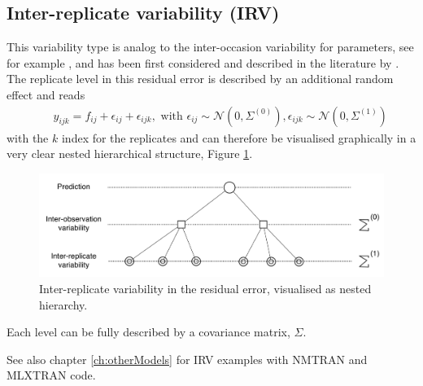 \subsection{Inter-replicate variability (IRV)}
This variability type is analog to the inter-occasion variability for parameters,
see for example \cite{LavielleBook:2014}, and has been first considered and described in the 
literature by \cite{Karlsson:1995rm}. The replicate level in this residual error 
is described by an additional random effect and reads  
\begin{eqnarray}
	&& y_{ijk} = f_{ij} + \epsilon_{ij} + \epsilon_{ijk}, \text{ with } \epsilon_{ij} \sim \mathcal{N}(0,\Sigma^{(0)}), \epsilon_{ijk} \sim \mathcal{N}(0,\Sigma^{(1)}) 	\nonumber
\end{eqnarray}
with the $k$ index for the replicates and can therefore be visualised graphically 
in a very clear nested hierarchical structure, Figure \ref{fig:IRV_residualError}.
\begin{figure}[htb!]
\centering
  \includegraphics[width=140mm]{pics/IRV_residualError}
 \caption{Inter-replicate variability in the residual error, visualised 
 as nested hierarchy.}
 \label{fig:IRV_residualError}
\end{figure}
Each level can be fully described by a covariance matrix, $\Sigma$.

\smallskip
See also chapter \ref{ch:otherModels} for IRV examples with NMTRAN and MLXTRAN code.

